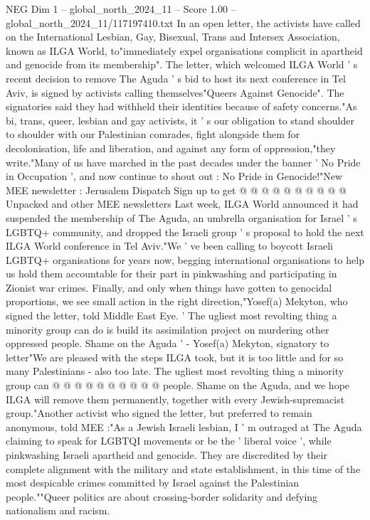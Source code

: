 \begin{textsample}{NEG Dim 1 – global\_north\_2024\_11 – Score 1.00 – global\_north\_2024\_11/117197410.txt}  \label{ex:f1_neg_113}
In an open letter, the activists have called on the International Lesbian, Gay, Bisexual, Trans and Intersex Association, known as ILGA World, to"immediately expel organisations complicit in apartheid and genocide from its membership".
The letter, which welcomed ILGA World ' s recent decision to remove The Aguda ' s bid to host its next conference in Tel Aviv, is signed by activists calling themselves"Queers Against Genocide".
The signatories said they had withheld their identities because of safety concerns."As bi, trans, queer, lesbian and gay activists, it ' s our obligation to stand shoulder to shoulder with our Palestinian comrades, fight alongside them for decolonisation, life and liberation, and against any form of oppression,"they write."Many of us have marched in the past decades under the banner ' No Pride in Occupation ', and now continue to shout out : No Pride in Genocide!"New MEE newsletter : Jerusalem Dispatch Sign up to get @ @ @ @ @ @ @ @ @ @ Unpacked and other MEE newsletters Last week, ILGA World announced it had suspended the membership of The Aguda, an umbrella organisation for Israel ' s LGBTQ+ community, and dropped the Israeli group ' s proposal to hold the next ILGA World conference in Tel Aviv."We ' ve been calling to boycott Israeli LGBTQ+ organisations for years now, begging international organisations to help us hold them accountable for their part in pinkwashing and participating in Zionist war crimes.
Finally, and only when things have gotten to genocidal proportions, we see small action in the right direction,"Yosef(a) Mekyton, who signed the letter, told Middle East Eye. ' The ugliest most revolting thing a minority group can do is build its assimilation project on murdering other oppressed people.
Shame on the Aguda ' - Yosef(a) Mekyton, signatory to letter"We are pleased with the steps ILGA took, but it is too little and for so many Palestinians - also too late.
The ugliest most revolting thing a minority group can @ @ @ @ @ @ @ @ @ @ people.
Shame on the Aguda, and we hope ILGA will remove them permanently, together with every Jewish-supremacist group."Another activist who signed the letter, but preferred to remain anonymous, told MEE :"As a Jewish Israeli lesbian, I ' m outraged at The Aguda claiming to speak for LGBTQI movements or be the ' liberal voice ', while pinkwashing Israeli apartheid and genocide.
They are discredited by their complete alignment with the military and state establishment, in this time of the most despicable crimes committed by Israel against the Palestinian people.""Queer politics are about crossing-border solidarity and defying nationalism and racism.

\end{textsample}
